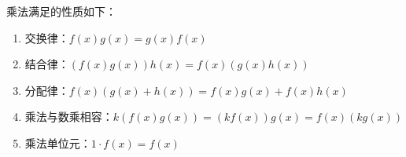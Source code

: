 \begin{formal}
\begin{theorem}[乘法的性质]\label{thm:乘法的性质}
    乘法满足的性质如下：

    \begin{enumerate}[label={\textup{(\arabic*)}}]
        \item 交换律：$f\left(x\right)g\left(x\right)=
        g\left(x\right) f\left(x\right)$
        \item 结合律：$\left(f\left(x\right)g\left(x\right)\right)h\left(x\right)=
        f\left(x\right)\left(g\left(x\right)h\left(x\right)\right)$
        \item 分配律：$f\left(x\right)\left(g\left(x\right)+h\left(x\right)\right)=f\left(x\right)g\left(x\right)+f\left(x\right)h\left(x\right)$
        \item 乘法与数乘相容：$k\left(f\left(x\right)g\left(x\right)\right)=\left(kf\left(x\right)\right)g\left(x\right)=f\left(x\right)
        \left(kg\left(x\right)\right)$
        \item 乘法单位元：$1\cdot f\left(x\right)=f\left(x\right)$
    \end{enumerate}
\end{theorem}
\end{formal}
